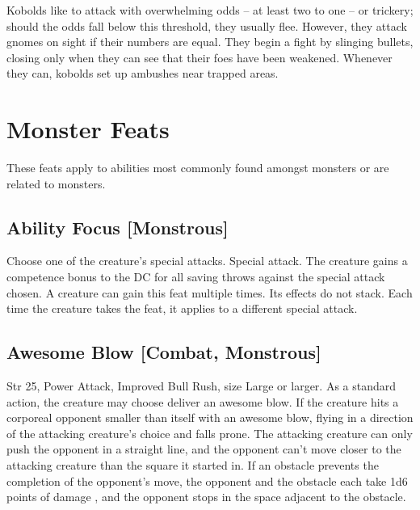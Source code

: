 Kobolds like to attack with overwhelming odds -- at least two to one -- or trickery; should the odds fall below this threshold, they usually flee. However, they attack gnomes on sight if their numbers are equal.
They begin a fight by slinging bullets, closing only when they can see that their foes have been weakened. Whenever they can, kobolds set up ambushes near trapped areas.

\section{Monster Feats}

These feats apply to abilities most commonly found amongst monsters or are related to monsters.

\subsection{Ability Focus [Monstrous]}
Choose one of the creature's special attacks.
 Special attack.
 The creature gains a  competence bonus to the DC for all saving throws against the special attack chosen.
 A creature can gain this feat multiple times. Its effects do not stack. Each time the creature takes the feat, it applies to a different special attack.

\subsection{Awesome Blow [Combat, Monstrous]}
 Str 25, Power Attack, Improved Bull Rush, size Large or larger.
 As a standard action, the creature may choose  deliver an awesome blow. If the creature hits a corporeal opponent smaller than itself with an awesome blow,  flying  in a direction of the attacking creature's choice and falls prone. The attacking creature can only push the opponent in a straight line, and the opponent can't move closer to the attacking creature than the square it started in. If an obstacle prevents the completion of the opponent's move, the opponent and the obstacle each take 1d6 points of damage , and the opponent stops in the space adjacent to the obstacle.

